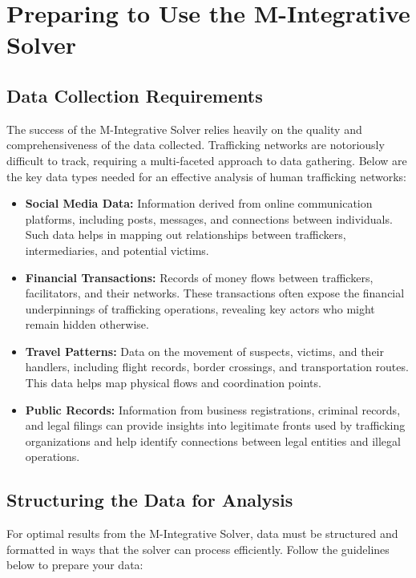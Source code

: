 \documentclass[%
 preprint, linenumbers,
 amsmath,amssymb,
 aps, physrev,
]{revtex4-2}
\begin{document}
\section{Preparing to Use the M-Integrative Solver}

\subsection{Data Collection Requirements}

The success of the M-Integrative Solver relies heavily on the quality and comprehensiveness of the data collected. Trafficking networks are notoriously difficult to track, requiring a multi-faceted approach to data gathering. Below are the key data types needed for an effective analysis of human trafficking networks:

\begin{itemize}
    \item \textbf{Social Media Data:} Information derived from online communication platforms, including posts, messages, and connections between individuals. Such data helps in mapping out relationships between traffickers, intermediaries, and potential victims.
    \item \textbf{Financial Transactions:} Records of money flows between traffickers, facilitators, and their networks. These transactions often expose the financial underpinnings of trafficking operations, revealing key actors who might remain hidden otherwise.
    \item \textbf{Travel Patterns:} Data on the movement of suspects, victims, and their handlers, including flight records, border crossings, and transportation routes. This data helps map physical flows and coordination points.
    \item \textbf{Public Records:} Information from business registrations, criminal records, and legal filings can provide insights into legitimate fronts used by trafficking organizations and help identify connections between legal entities and illegal operations.
\end{itemize}

\subsection{Structuring the Data for Analysis}

For optimal results from the M-Integrative Solver, data must be structured and formatted in ways that the solver can process efficiently. Follow the guidelines below to prepare your data:
\end{document}
